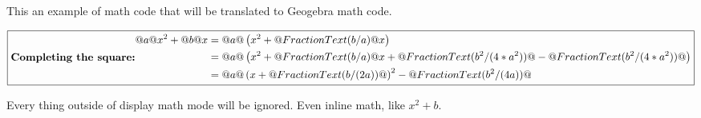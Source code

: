 \documentclass{article}
\begin{document}
This an example of math code that will be translated to Geogebra math
code.

\[
\boxed{
  \textbf{Completing the square:}\\
  \\
  \begin{aligned}
    @a@ x^2 + @b@ x
    &= @a@ \left( x^2 + @FractionText(b/a)@ x \right) \\
    &= @a@ \left( x^2 + @FractionText(b/a)@ x +
      @FractionText(b^2/(4*a^2))@ -  @FractionText(b^2/(4*a^2))@ \right) \\
    &= @a@ \left( x + @FractionText(b/(2a))@ \right)^2 
      - @FractionText(b^2/(4a))@
  \end{aligned}
}
\]

Every thing outside of display math mode will be ignored. Even inline
math, like $x^2 + b$.
\end{document}

